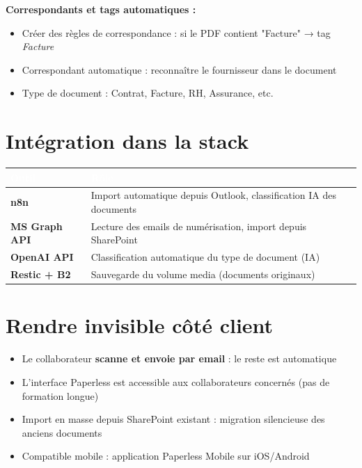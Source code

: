 \documentclass[11pt, a4paper]{article}
\begin{document}
\textbf{Correspondants et tags automatiques :}
\begin{itemize}
  \item Créer des règles de correspondance : si le PDF contient "Facture" → tag \textit{Facture}
  \item Correspondant automatique : reconnaître le fournisseur dans le document
  \item Type de document : Contrat, Facture, RH, Assurance, etc.
\end{itemize}

\section{Intégration dans la stack}

\begin{center}
\renewcommand{\arraystretch}{1.4}
\begin{tabularx}{\linewidth}{>{\bfseries}p{2.8cm} X}
\toprule
\rowcolor{tabheader}
\textcolor{white}{\textbf{Outil}} & \textcolor{white}{\textbf{Rôle}} \\
\midrule
n8n & Import automatique depuis Outlook, classification IA des documents \\
\rowcolor{rowgray}
MS Graph API & Lecture des emails de numérisation, import depuis SharePoint \\
OpenAI API & Classification automatique du type de document (IA) \\
\rowcolor{rowgray}
Restic + B2 & Sauvegarde du volume media (documents originaux) \\
\bottomrule
\end{tabularx}
\end{center}

\section{Rendre invisible côté client}

\begin{itemize}
  \item Le collaborateur \textbf{scanne et envoie par email} : le reste est automatique
  \item L'interface Paperless est accessible aux collaborateurs concernés (pas de formation longue)
  \item Import en masse depuis SharePoint existant : migration silencieuse des anciens documents
  \item Compatible mobile : application Paperless Mobile sur iOS/Android
\end{itemize}
\end{document}
